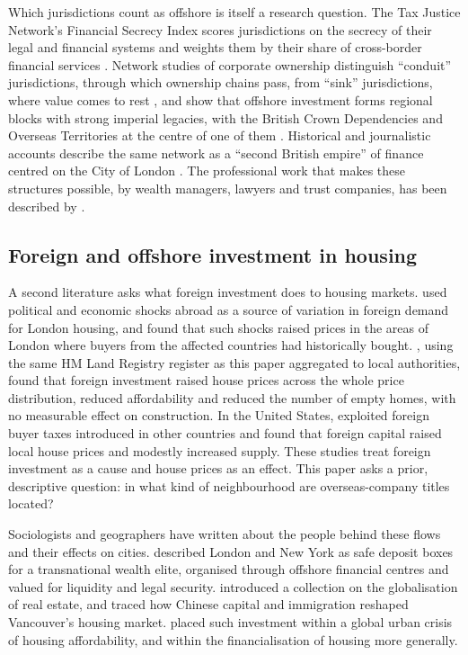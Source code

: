\documentclass[11pt,a4paper]{article}
\begin{document}
Which jurisdictions count as offshore is itself a research question. The Tax Justice Network's Financial Secrecy Index scores jurisdictions on the secrecy of their legal and financial systems and weights them by their share of cross-border financial services \citep{cobham2015,tjn2018}. Network studies of corporate ownership distinguish ``conduit'' jurisdictions, through which ownership chains pass, from ``sink'' jurisdictions, where value comes to rest \citep{garcia2017}, and show that offshore investment forms regional blocks with strong imperial legacies, with the British Crown Dependencies and Overseas Territories at the centre of one of them \citep{haberly2015a,haberly2015b}. Historical and journalistic accounts describe the same network as a ``second British empire'' of finance centred on the City of London \citep{palan2010,shaxson2011}. The professional work that makes these structures possible, by wealth managers, lawyers and trust companies, has been described by \citet{harrington2016}.

\subsection{Foreign and offshore investment in housing}
A second literature asks what foreign investment does to housing markets. \citet{badarinza2018} used political and economic shocks abroad as a source of variation in foreign demand for London housing, and found that such shocks raised prices in the areas of London where buyers from the affected countries had historically bought. \citet{sa2025}, using the same HM Land Registry register as this paper aggregated to local authorities, found that foreign investment raised house prices across the whole price distribution, reduced affordability and reduced the number of empty homes, with no measurable effect on construction. In the United States, \citet{gorback2020} exploited foreign buyer taxes introduced in other countries and found that foreign capital raised local house prices and modestly increased supply. These studies treat foreign investment as a cause and house prices as an effect. This paper asks a prior, descriptive question: in what kind of neighbourhood are overseas-company titles located?

Sociologists and geographers have written about the people behind these flows and their effects on cities. \citet{fernandez2016} described London and New York as safe deposit boxes for a transnational wealth elite, organised through offshore financial centres and valued for liquidity and legal security. \citet{rogers2017} introduced a collection on the globalisation of real estate, and \citet{ley2017} traced how Chinese capital and immigration reshaped Vancouver's housing market. \citet{wetzstein2017} placed such investment within a global urban crisis of housing affordability, and \citet{aalbers2016} within the financialisation of housing more generally.
\end{document}
